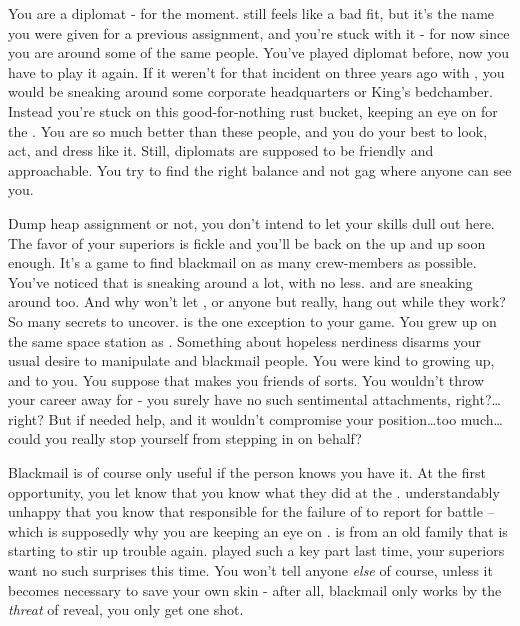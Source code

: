 \documentclass[char]{TMFHope}
\begin{document}
\name{\cDip{}}

You are a diplomat - for the moment. \cDip{\full} still feels like a bad fit, but it's the name you were given for a previous assignment, and you're stuck with it - for now since you are around some of the same people. You've played diplomat before, now you have to play it again. If it weren't for that incident on \pHome{} three years ago with \cWeap{\full}, you would be sneaking around some corporate headquarters or King's bedchamber. Instead you're stuck on this good-for-nothing rust bucket, keeping an eye on \cXO{\full} for the \pPlan{}. You are so much better than these people, and you do your best to look, act, and dress like it. Still, diplomats are supposed to be friendly and approachable. You try to find the right balance and not gag where anyone can see you.

Dump heap assignment or not, you don't intend to let your skills dull out here. The favor of your superiors is fickle and you'll be back on the up and up soon enough. It's a game to find blackmail on as many crew-members as possible. You've noticed that \cSci{} is sneaking around a lot, with \cXO{} no less. \cBoy{} and \cNav{} are sneaking around too. And why won't \cEng{} let \cWeap{}, or anyone but \cBoy{} really, hang out while they work? So many secrets to uncover. \cMed{\full} is the one exception to your game. You grew up on the same space station as \cMed{\them}. Something about \cMed{\their} hopeless nerdiness disarms your usual desire to manipulate and blackmail people. You were kind to \cMed{\them} growing up, and \cMed{\they} to you. You suppose that makes you friends of sorts. You wouldn't throw your career away for \cMed{\them} - you surely have no such sentimental attachments, right?\ldots right? But if \cMed{} needed help, and it wouldn't compromise your position\ldots too much\ldots could you really stop yourself from stepping in on \cMed{\their} behalf?

Blackmail is of course only useful if the person knows you have it. At the first opportunity, you let \cXO{} know that you know what they did at the \pBattle{}. \cXO{\They} \cXO{\are} understandably unhappy that you know that \cXO{\they} \cXO{\are} responsible for the failure of \pOld{} to report for battle -- which is supposedly why you are keeping an eye on \cXO{\them}. \cXO{} is from an old \pEdge{} family that is starting to stir up trouble again. \cXO{\They} played such a key part last time, your superiors want no such surprises this time. You won't tell anyone \emph{else} of course, unless it becomes necessary to save your own skin - after all, blackmail only works by the \emph{threat} of reveal, you only get one shot. 
\end{document}

